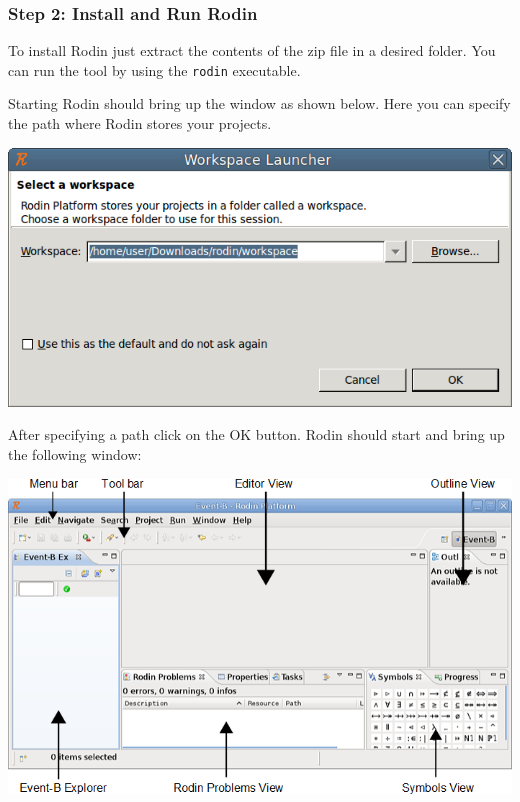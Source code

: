 
\subsubsection{Step 2: Install and Run Rodin}

To install Rodin just extract the contents of the zip file in a desired folder. You can run the tool by using the \texttt{rodin} executable.

Starting Rodin should bring up the window as shown below. Here you can specify the path where Rodin stores your projects.

\begin{center}
	\includegraphics{img/tutorial/install2.png}
\end{center}

After specifying a path click on the \textsf{OK} button. Rodin should start and bring up the following window:

\begin{center}
	\includegraphics{img/tutorial/install3.png}
\end{center}

